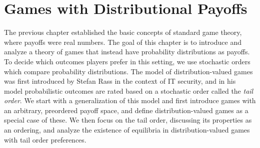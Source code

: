 \documentclass[a4paper]{scrreprt}
\begin{document}
    \chapter{Games with Distributional Payoffs}
    The previous chapter established the basic concepts of standard game theory, where payoffs were real numbers.
    The goal of this chapter is to introduce and analyze a theory of games that instead have probability distributions as payoffs.
    To decide which outcomes players prefer in this setting, we use stochastic orders which compare probability distributions.
    The model of distribution-valued games was first introduced by Stefan Rass %
    in the context of IT security, and in his model probabilistic outcomes are rated based on a stochastic order called the \emph{tail order}.
    We start with a generalization of this model and first introduce games with an arbitrary, preordered payoff space, and define distribution-valued games as a special case of these.
    We then focus on the tail order, discussing its properties as an ordering, and analyze the existence of equilibria in distribution-valued games with tail order preferences.
    
\end{document}

